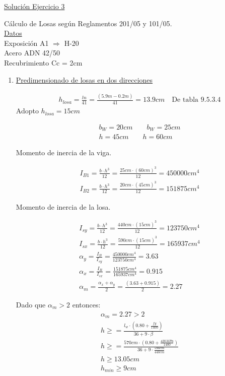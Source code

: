 \begin{center}
\underline{\large{Solución Ejercicio 3}} \\
\end{center}

Cálculo de Losas según Reglamentos 201/05 y 101/05. \\
\underline{Datos} \\
Exposición A1 $\Rightarrow$ H-20 \\
Acero ADN 42/50 \\
Recubrimiento Cc = 2cm

\begin{enumerate}
\item \underline{Predimensionado de losas en dos direcciones}

\begin{align*}
& h_{losa} = \frac{ln}{41} = \frac{(5.9m-0.2m)}{41} = 13.9cm \quad \text{De tabla 9.5.3.4}
\end{align*}
Adopto $h_{losa} = 15cm$

\begin{align*}
& b_W = 20cm \qquad b_W = 25cm\\
& h = 45cm \qquad h = 60cm
\end{align*}

Momento de inercia de la viga.

\begin{align*}
& I_{B1} = \frac{b \cdot h^3}{12} = \frac{25cm \cdot (60cm)^3}{12} = 450000cm^4\\
& I_{B2} = \frac{b \cdot h^3}{12} = \frac{20cm \cdot (45cm)^3}{12} = 151875cm^4
\end{align*}

Momento de inercia de la losa.

\begin{align*}
& I_{sy} = \frac{b \cdot h^3}{12} = \frac{440cm \cdot (15cm)^3}{12} = 123750cm^4\\
& I_{sx} = \frac{b \cdot h^3}{12} = \frac{590cm \cdot (15cm)^3}{12} = 165937cm^4\\
& \alpha_y = \frac{I_B}{I_{sy}} = \frac{450000cm^4}{123750cm^4} = 3.63 \\
& \alpha_x = \frac{I_B}{I_{sx}} = \frac{151875cm^4}{165937cm^4} = 0.915 \\
& \alpha_m = \frac{\alpha_x+\alpha_y}{2} = \frac{(3.63+0.915)}{2} = 2.27
\end{align*}

\newpage
Dado que $\alpha_m > 2 $ entonces:
\begin{align*}
& \alpha_m = 2.27 > 2 \\
& h \geq = \frac{l_w \cdot (0.80+ \frac{fy}{1400})}{36+ 9 \cdot \beta} \\
& h \geq = \frac{570cm \cdot (0.80+ \frac{420MPa}{1400})}{36+ 9 \cdot \frac{590cm}{440cm}} \\
& h \geq 13.05cm \\
& h_{min} \geq 9cm
\end{align*}


\end{enumerate}
